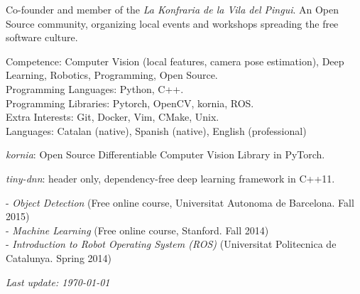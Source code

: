 \documentclass{article}
\begin{document}
\begin{llist}
Co-founder and member of the \textit{La Konfraria de la Vila del Pingui}. An Open Source community, organizing local events and workshops spreading the free software culture.


\label{Skills}
Competence: Computer Vision (local features, camera pose estimation), Deep Learning, Robotics, Programming, Open Source.\\
Programming Languages: Python, C++.\\
Programming Libraries: Pytorch, OpenCV, kornia, ROS. \\
Extra Interests: Git, Docker, Vim, CMake, Unix. \\
Languages: Catalan (native), Spanish (native), English  (professional)


{\em kornia}: Open Source Differentiable Computer Vision Library in PyTorch.

{\em tiny-dnn}: header only, dependency-free deep learning framework in C++11.


%



\label{Relevant Coursework}
- \textit{Object Detection} (Free online course, Universitat Autonoma de Barcelona. Fall 2015)\\
- \textit{Machine Learning} (Free online course, Stanford. Fall 2014)\\
- \textit{Introduction to Robot Operating System (ROS)} (Universitat Politecnica de Catalunya. Spring 2014)

\label{Reference}


\end{llist}

{\em Last update: \today}
\end{document}
